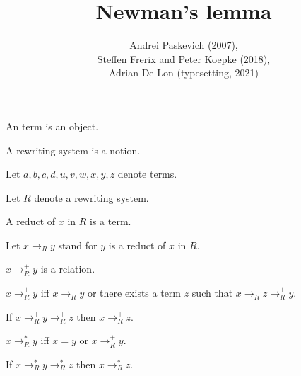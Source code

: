 \documentclass[english]{article}
\title{Newman's lemma}
\author{Andrei Paskevich (2007), \\
Steffen Frerix and Peter Koepke (2018), \\
Adrian De Lon (typesetting, 2021)}
\date{}
\newcommand{\reduces}[1]{\to_{#1}}
\newcommand{\reducesTC}[1]{\to_{#1}^{+}}
\newcommand{\reducesTCR}[1]{\to_{#1}^{*}}
\begin{document}

  \maketitle
  
  \begin{forthel}
  \end{forthel}

  \begin{forthel}

    \begin{signature}
      An term is an object.
    \end{signature}

    \begin{signature}
      A rewriting system is a notion.
    \end{signature}

    Let $a,b,c,d,u,v,w,x,y,z$ denote terms.

    Let $R$ denote a rewriting system.

    \begin{signature}[title=Reduct]
      A reduct of $x$ in $R$ is a term.
    \end{signature}

    Let $x \reduces{R} y$ stand for $y$ is a reduct of $x$ in $R$.

    \begin{signature}
      $x \reducesTC{R} y$ is a relation.
    \end{signature}

    \begin{axiom}
      $x \reducesTC{R} y$ iff $x \reduces{R} y$
      or there exists a term $z$ such that
      $x \reduces{R} z \reducesTC{R} y$.
    \end{axiom}

    \begin{axiom}
      If $x \reducesTC{R} y \reducesTC{R} z$ then $x \reducesTC{R} z$.
    \end{axiom}

    \begin{definition}
      $x \reducesTCR{R} y$ iff $x = y$ or $x \reducesTC{R} y$.
    \end{definition}

    \begin{lemma}
      If $x \reducesTCR{R} y \reducesTCR{R} z$ then $x \reducesTCR{R} z$.
    \end{lemma}


\end{forthel}
\end{document}
